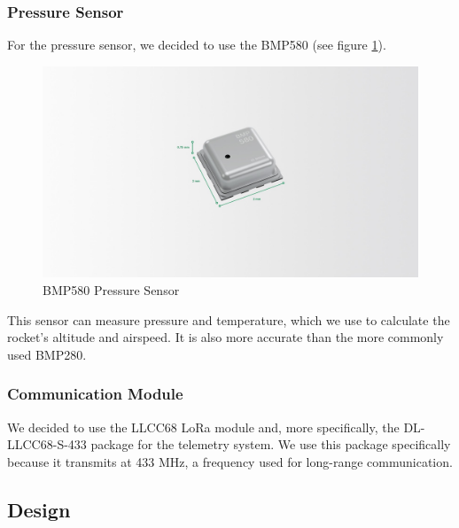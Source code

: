 \documentclass{article}
\begin{document}
\subsubsection*{Pressure Sensor}
For the pressure sensor, we decided to use the BMP580 (see figure \ref{fig:bmp580}).
\begin{figure}[p]
      \caption{BMP580 Pressure Sensor\cite{BMP580}}
      \label{fig:bmp580}
      \centering
      \includegraphics[width=\textwidth]{bmp580.jpg}
\end{figure}This sensor can measure pressure and temperature, which we use to calculate the rocket's altitude and airspeed. It is also more accurate than the more commonly used BMP280.\cite{Bosch_Sensortec_2024}

\subsubsection{Communication Module}
We decided to use the LLCC68 LoRa module and, more specifically, the DL-LLCC68-S-433 package for the telemetry system. We use this package specifically because it transmits at 433 MHz, a frequency used for long-range communication.

\subsection{Design}
\end{document}
